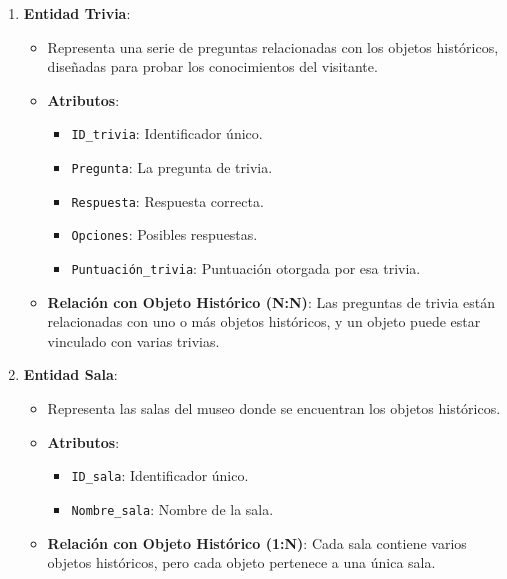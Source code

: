 \documentclass{report}
\begin{document}
\begin{enumerate}
    \item \textbf{Entidad Trivia}:
    \begin{itemize}
        \item Representa una serie de preguntas relacionadas con los objetos históricos, diseñadas para probar los conocimientos del visitante.
        \item \textbf{Atributos}:
        \begin{itemize}
            \item \texttt{ID\_trivia}: Identificador único.
            \item \texttt{Pregunta}: La pregunta de trivia.
            \item \texttt{Respuesta}: Respuesta correcta.
            \item \texttt{Opciones}: Posibles respuestas.
            \item \texttt{Puntuación\_trivia}: Puntuación otorgada por esa trivia.
        \end{itemize}
        \item \textbf{Relación con Objeto Histórico (N:N)}: Las preguntas de trivia están relacionadas con uno o más objetos históricos, y un objeto puede estar vinculado con varias trivias.
    \end{itemize}

    \item \textbf{Entidad Sala}:
    \begin{itemize}
        \item Representa las salas del museo donde se encuentran los objetos históricos.
        \item \textbf{Atributos}:
        \begin{itemize}
            \item \texttt{ID\_sala}: Identificador único.
            \item \texttt{Nombre\_sala}: Nombre de la sala.
        \end{itemize}
        \item \textbf{Relación con Objeto Histórico (1:N)}: Cada sala contiene varios objetos históricos, pero cada objeto pertenece a una única sala.
    \end{itemize}


\end{enumerate}
\end{document}
